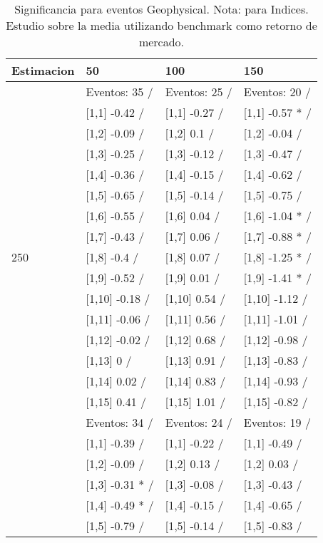 \begin{table}

\caption{Significancia para eventos Geophysical. Nota: para Indices. Estudio sobre la media utilizando benchmark como retorno de mercado.}
\centering
\begin{tabular}[t]{llll}
\toprule
Estimacion & 50 & 100 & 150\\
\midrule
 & Eventos:  35 / & Eventos:  25 / & Eventos:  20 /\\
 & {}[1,1] -0.42  / & {}[1,1] -0.27  / & {}[1,1] -0.57 * /\\
 & {}[1,2] -0.09  / & {}[1,2] 0.1  / & {}[1,2] -0.04  /\\
 & {}[1,3] -0.25  / & {}[1,3] -0.12  / & {}[1,3] -0.47  /\\
 & {}[1,4] -0.36  / & {}[1,4] -0.15  / & {}[1,4] -0.62  /\\
\addlinespace
 & {}[1,5] -0.65  / & {}[1,5] -0.14  / & {}[1,5] -0.75  /\\
 & {}[1,6] -0.55  / & {}[1,6] 0.04  / & {}[1,6] -1.04 * /\\
 & {}[1,7] -0.43  / & {}[1,7] 0.06  / & {}[1,7] -0.88 * /\\
250 & {}[1,8] -0.4  / & {}[1,8] 0.07  / & {}[1,8] -1.25 * /\\
 & {}[1,9] -0.52  / & {}[1,9] 0.01  / & {}[1,9] -1.41 * /\\
\addlinespace
 & {}[1,10] -0.18  / & {}[1,10] 0.54  / & {}[1,10] -1.12  /\\
 & {}[1,11] -0.06  / & {}[1,11] 0.56  / & {}[1,11] -1.01  /\\
 & {}[1,12] -0.02  / & {}[1,12] 0.68  / & {}[1,12] -0.98  /\\
 & {}[1,13] 0  / & {}[1,13] 0.91  / & {}[1,13] -0.83  /\\
 & {}[1,14] 0.02  / & {}[1,14] 0.83  / & {}[1,14] -0.93  /\\
\addlinespace
 & {}[1,15] 0.41  / & {}[1,15] 1.01  / & {}[1,15] -0.82  /\\
 & Eventos:  34 / & Eventos:  24 / & Eventos:  19 /\\
 & {}[1,1] -0.39  / & {}[1,1] -0.22  / & {}[1,1] -0.49  /\\
 & {}[1,2] -0.09  / & {}[1,2] 0.13  / & {}[1,2] 0.03  /\\
 & {}[1,3] -0.31 * / & {}[1,3] -0.08  / & {}[1,3] -0.43  /\\
\addlinespace
 & {}[1,4] -0.49 * / & {}[1,4] -0.15  / & {}[1,4] -0.65  /\\
 & {}[1,5] -0.79  / & {}[1,5] -0.14  / & {}[1,5] -0.83  /\\

\end{tabular}
\end{table}

